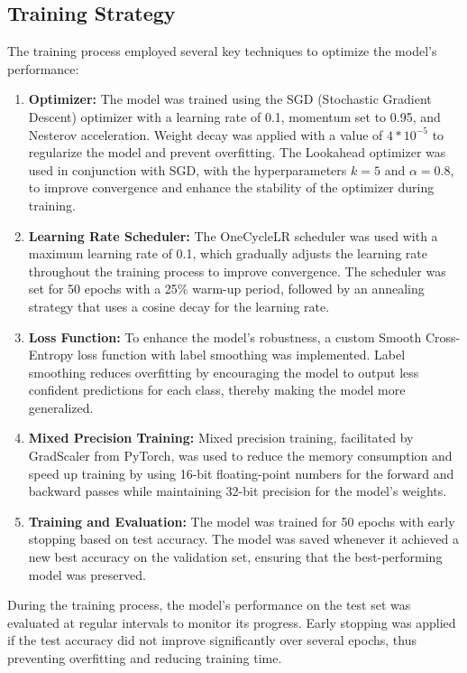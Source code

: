 \documentclass[twoside, 11pt]{article}
\begin{document}
\subsection{Training Strategy}
The training process employed several key techniques to optimize the model’s performance:
\begin{enumerate}
    \item \textbf{Optimizer:} The model was trained using the SGD (Stochastic Gradient Descent) optimizer with a learning rate of 0.1, momentum set to 0.95, and Nesterov acceleration. Weight decay was applied with a value of $4 * 10^{-5}$ to regularize the model and prevent overfitting. The Lookahead optimizer was used in conjunction with SGD, with the hyperparameters $k = 5$ and $\alpha = 0.8$, to improve convergence and enhance the stability of the optimizer during training.
    \item \textbf{Learning Rate Scheduler: }The OneCycleLR scheduler was used with a maximum learning rate of 0.1, which gradually adjusts the learning rate throughout the training process to improve convergence. The scheduler was set for 50 epochs with a 25\% warm-up period, followed by an annealing strategy that uses a cosine decay for the learning rate.
    \item \textbf{Loss Function: } To enhance the model’s robustness, a custom Smooth Cross-Entropy loss function with label smoothing was implemented. Label smoothing reduces overfitting by encouraging the model to output less confident predictions for each class, thereby making the model more generalized.
    \item \textbf{Mixed Precision Training: } Mixed precision training, facilitated by GradScaler from PyTorch, was used to reduce the memory consumption and speed up training by using 16-bit floating-point numbers for the forward and backward passes while maintaining 32-bit precision for the model's weights.
    \item \textbf{Training and Evaluation:} The model was trained for 50 epochs with early stopping based on test accuracy. The model was saved whenever it achieved a new best accuracy on the validation set, ensuring that the best-performing model was preserved.
\end{enumerate}
During the training process, the model's performance on the test set was evaluated at regular intervals to monitor its progress. Early stopping was applied if the test accuracy did not improve significantly over several epochs, thus preventing overfitting and reducing training time.
\end{document}
